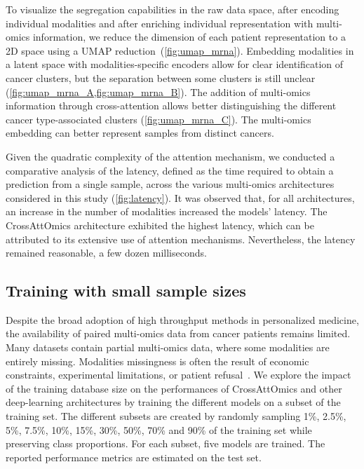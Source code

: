 \documentclass[../main.tex]{subfiles}
\begin{document}
	    To visualize the segregation capabilities in the raw data space, after encoding individual modalities and after enriching individual representation with multi-omics information, we reduce the dimension of each patient representation to a 2D space using a UMAP reduction~(\cref{fig:umap_mrna}).
	    Embedding modalities in a latent space with modalities-specific encoders allow for clear identification of cancer clusters, but the separation between some clusters is still unclear (\cref{fig:umap_mrna_A,fig:umap_mrna_B}).
	    The addition of multi-omics information through cross-attention allows better distinguishing the different cancer type-associated clusters (\cref{fig:umap_mrna_C}).
	    The multi-omics embedding can better represent samples from distinct cancers.


	    Given the quadratic complexity of the attention mechanism, we conducted a comparative analysis of the latency, defined as the time required to obtain a prediction from a single sample, across the various multi-omics architectures considered in this study (\cref{fig:latency}).
	    It was observed that, for all architectures, an increase in the number of modalities increased the models' latency.
	    The CrossAttOmics architecture exhibited the highest latency, which can be attributed to its extensive use of attention mechanisms. Nevertheless, the latency remained reasonable,  a few dozen milliseconds.

	\subsection{Training with small sample sizes}
	    Despite the broad adoption of high throughput methods in personalized medicine, the availability of paired multi-omics data from cancer patients remains limited.
	    Many datasets contain partial multi-omics data, where some modalities are entirely missing.
	    Modalities missingness is often the result of economic constraints, experimental limitations, or patient refusal~\cite{Kang2021}.
	    We explore the impact of the training database size on the performances of CrossAttOmics and other deep-learning architectures by training the different models on a subset of the training set.
	    The different subsets are created by randomly sampling 1\%, 2.5\%, 5\%, 7.5\%, 10\%, 15\%, 30\%, 50\%, 70\% and 90\% of the training set while preserving class proportions.
	    For each subset, five models are trained.
	    The reported performance metrics are estimated on the test set.
\end{document}
